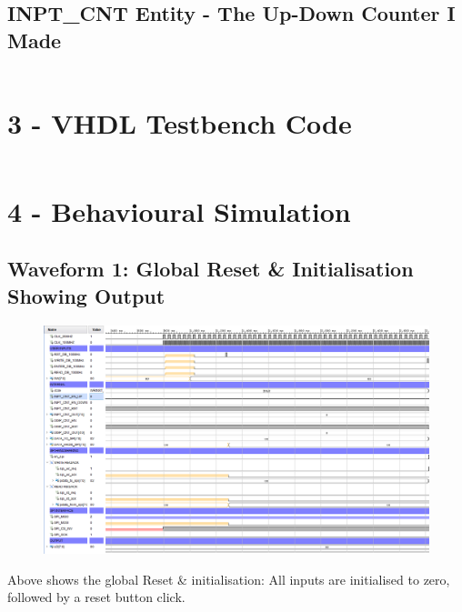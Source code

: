 \documentclass[11pt]{report}
\begin{document}
\newpage

\subsection*{INPT\_CNT Entity - The Up-Down Counter I Made}
\inputminted{vhdl}{../../../DE_Project_T3/DE_Project_T3.srcs/sources_1/new/Param_Counter_UpDown.vhd}

\newpage

\section*{3 - VHDL Testbench Code}
\inputminted{vhdl}{../../../DE_Project_T3/DE_Project_T3.srcs/sim_1/imports/DigEng_Proj_T3_model/TOP_LEVEL_tb.vhd}

\newpage

\section*{4 - Behavioural Simulation}

\subsection*{Waveform 1: Global Reset \& Initialisation Showing Output}
\begin{figure}[H]
    \includegraphics[width=\columnwidth]{Assets/GlobalReset.png}
\end{figure}

Above shows the global Reset \& initialisation: All inputs are initialised to zero, followed by a reset button click.
\end{document}
